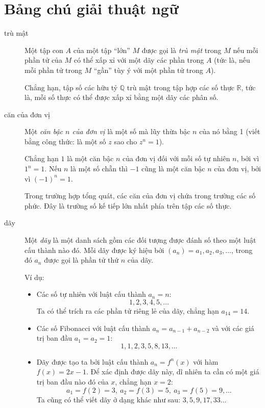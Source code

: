 \section*{Bảng chú giải thuật ngữ}
\begin{description}
	\item[trù mật] Một tập con $A$ của một tập \enquote{lớn} $M$ được gọi là \emph{trù mật} trong $M$ nếu mỗi phần tử của $M$ có thể xấp xỉ với một dãy các phần trong $A$ (tức là, nếu mỗi phần tử trong $M$ \enquote{gần} tùy ý với một phần tử trong $A$).

		Chẳng hạn, tập số các hữu tỷ $\mathbb Q$ trù mật trong tập hợp các số thực $\mathbb R$, tức là, mỗi số thực có thể được xấp xỉ bằng một dãy các phân số.

	\item[căn của đơn vị] Một \emph{căn bậc $n$ của đơn vị } là một số mà lũy thừa bậc $n$ của nó bằng 1 (viết bằng công thức: là một số $z$ sao cho $z^n=1$).

		Chẳng hạn $1$ là một căn bậc $n$ của đơn vị đối với mỗi số tự nhiên $n$, bởi vì $1^n=1$. Nếu $n$ là một số chẵn thì $-1$ cũng là một căn bậc $n$ của đơn vị, bởi vì $(-1)^n=1$.

		Trong trường hợp tổng quát, các căn của đơn vị chứa trong trường các số phức. Đây là trường số kế tiếp lớn nhất phía trên tập các số thực.

	\item[dãy] Một \emph{dãy} là một danh sách gồm các đối tượng được đánh số theo một luật cấu thành nào đó. Mỗi dãy được ký hiệu bởi $(a_n) = a_1,a_2,a_3,\dots $, trong đó $a_n$ được gọi là phần tử thứ $n$ của dãy.

		Ví dụ:
		\begin{itemize}
		\item Các số tự nhiên với luật cấu thành $a_n = n$:
			\begin{equation*}
				1,2,3,4,5,\dotsc{}
			\end{equation*}
			Ta có thể trích ra các phần tử riêng lẻ của dãy, chẳng hạn $a_{14} = 14$.
		\item Các số Fibonacci với luật cấu thành $a_n = a_{n-1}+a_{n-2}$ và với các giá trị ban đầu $a_1 = a_2 = 1$:
			\begin{equation*}
			1,1,2,3,5,8,13,\dotsc{}
			\end{equation*}
		\item Dãy được tạo ta bởi luật cấu thành $a_n = f^n(x)$ với hàm $f(x) = 2x-1$. Để xác định được dãy này, dĩ nhiên ta cần có một giá trị ban đầu nào đó của $x$, chẳng hạn $x=2$:
			\begin{equation*}
				a_1 = f(2) = 3,\ a_2 = f(3) = 5,\ a_3 = f(5) = 9,\dotsc
			\end{equation*}
			Ta cũng có thể viết dãy ở dạng khác như sau: $3,5,9,17,33\dotsc{}$
		\end{itemize}


\end{description}
